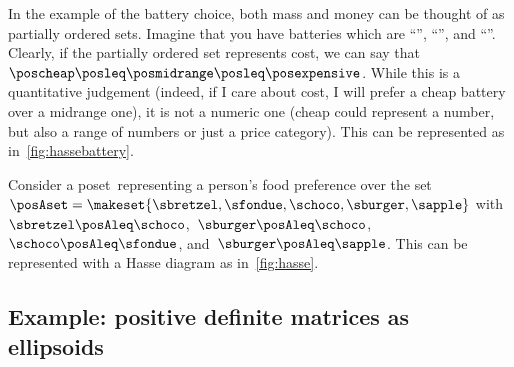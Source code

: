 \vspace{1cm}
\begin{marginfigure}[4mm]
    \centering
    \caption{Possible costs of a battery, represented as a poset.
    }
    \label{fig:hassebattery}
\end{marginfigure}
%
\begin{example}
    In the example of the battery choice, both mass and money can be thought of as partially ordered sets.
    Imagine that you have batteries which are ``\poscheap'', ``\posmidrange'', and ``\posexpensive''.
    Clearly, if the partially ordered set represents cost, we can say that~$\poscheap \posleq\posmidrange \posleq\posexpensive$.
    While this is a quantitative judgement (indeed, if I care about cost, I will prefer a cheap battery over a midrange one), it is not a numeric one (cheap could represent a number, but also a range of numbers or just a price category).
    This can be represented as in~\cref{fig:hassebattery}.
\end{example}

\vspace{1cm}
\begin{marginfigure}[4mm]
    \centering
    \caption{Example of Hasse diagram of~\posA.}
    \label{fig:hasse}
\end{marginfigure}
\begin{example}
    Consider a poset~\posA representing a person's food preference over the set~$\posAset=\makeset{\sbretzel,\sfondue,\schoco,\sburger,\sapple}$ with~$\sbretzel\posAleq \schoco$,~$\sburger\posAleq \schoco$,~$\schoco\posAleq \sfondue$, and~$\sburger\posAleq \sapple$.
    This can be represented with a Hasse diagram as in~\cref{fig:hasse}.
\end{example}

\vfill\clearpage

\subsection{Example: positive definite matrices as ellipsoids}

\begin{marginfigure}
    \centering

    \caption{}
    \label{fig:posdef}
\end{marginfigure}


